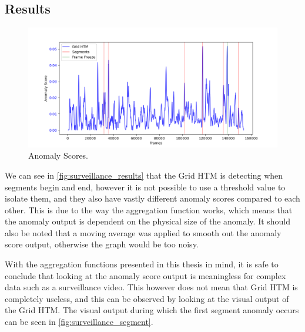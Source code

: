 \subsection{Results}
\begin{figure}[H]
    \centering
    \includegraphics[width=\textwidth]{resources/experiments/surveillance/surveillance_result.png}
    \caption{Anomaly Scores.}
    \label{fig:surveillance_results}
\end{figure}
We can see in \autoref{fig:surveillance_results} that the Grid HTM is detecting when segments begin and end, however it is not possible to use a threshold value to isolate them, and they also have vastly different anomaly scores compared to each other. This is due to the way the aggregation function works, which means that the anomaly output is dependent on the physical size of the anomaly. It should also be noted that a moving average was applied to smooth out the anomaly score output, otherwise the graph would be too noisy.
\par
With the aggregation functions presented in this thesis in mind, it is safe to conclude that looking at the anomaly score output is meaningless for complex data such as a surveillance video. This however does not mean that Grid HTM is completely useless, and this can be observed by looking at the visual output of the Grid HTM. The visual output during which the first segment anomaly occurs can be seen in \autoref{fig:surveillance_segment}.
